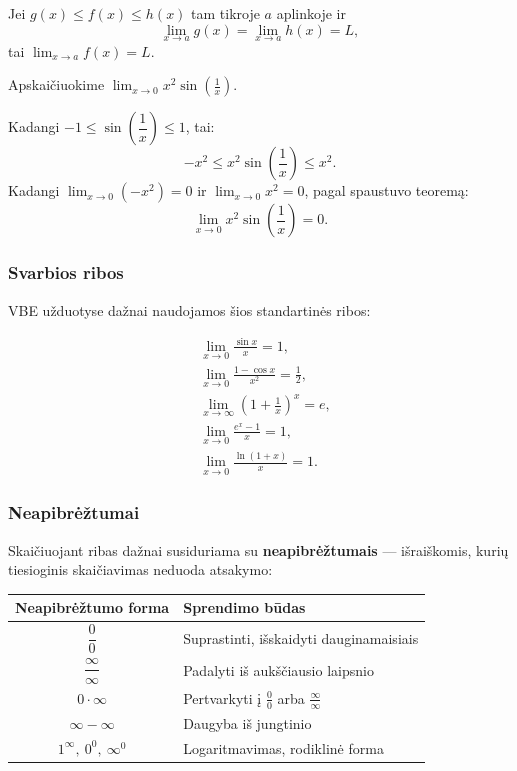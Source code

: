 \begin{theorem}
Jei $g(x) \leq f(x) \leq h(x)$ tam tikroje $a$ aplinkoje ir
\[
    \lim_{x \to a} g(x) = \lim_{x \to a} h(x) = L,
\]
tai $\displaystyle\lim_{x \to a} f(x) = L$.
\end{theorem}

\begin{example}
Apskaičiuokime $\displaystyle\lim_{x \to 0} x^2 \sin\!\left(\frac{1}{x}\right)$.

Kadangi $-1 \leq \sin\!\left(\dfrac{1}{x}\right) \leq 1$, tai:
\[
    -x^2 \leq x^2 \sin\!\left(\frac{1}{x}\right) \leq x^2.
\]
Kadangi $\displaystyle\lim_{x \to 0}(-x^2) = 0$ ir $\displaystyle\lim_{x \to 0} x^2 = 0$, pagal spaustuvo teoremą:
\[
    \lim_{x \to 0} x^2 \sin\!\left(\frac{1}{x}\right) = 0.
\]
\end{example}

\subsubsection*{Svarbios ribos}

VBE užduotyse dažnai naudojamos šios standartinės ribos:

\begin{tcolorbox}[colback=yellow!5!white, colframe=yellow!60!black, title=Standartinės ribos]
\begin{align}
    &\lim_{x \to 0} \frac{\sin x}{x} = 1, \\[6pt]
    &\lim_{x \to 0} \frac{1 - \cos x}{x^2} = \frac{1}{2}, \\[6pt]
    &\lim_{x \to \infty} \left(1 + \frac{1}{x}\right)^x = e, \\[6pt]
    &\lim_{x \to 0} \frac{e^x - 1}{x} = 1, \\[6pt]
    &\lim_{x \to 0} \frac{\ln(1+x)}{x} = 1.
\end{align}
\end{tcolorbox}

\subsubsection*{Neapibrėžtumai}

Skaičiuojant ribas dažnai susiduriama su \textbf{neapibrėžtumais} — išraiškomis, kurių tiesioginis skaičiavimas neduoda atsakymo:

\begin{center}
\begin{tabular}{c|l}
    \textbf{Neapibrėžtumo forma} & \textbf{Sprendimo būdas} \\
    \hline
    $\dfrac{0}{0}$ & Suprastinti, išskaidyti dauginamaisiais \\[4pt]
    $\dfrac{\infty}{\infty}$ & Padalyti iš aukščiausio laipsnio \\[4pt]
    $0 \cdot \infty$ & Pertvarkyti į $\frac{0}{0}$ arba $\frac{\infty}{\infty}$ \\[4pt]
    $\infty - \infty$ & Daugyba iš jungtinio \\[4pt]
    $1^\infty,\ 0^0,\ \infty^0$ & Logaritmavimas, rodiklinė forma \\
\end{tabular}
\end{center}

